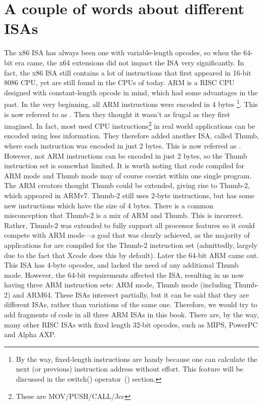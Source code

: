 \section{A couple of words about different \ac{ISA}s}
The x86 \ac{ISA} has always been one with variable-length opcodes, so when the 64-bit era came, the x64 extensions did not impact the \ac{ISA} very significantly. In fact, the x86 \ac{ISA} still contains a lot of instructions that first appeared in 16-bit 8086 CPU, yet are still found in the CPUs of today.
ARM is a \ac{RISC} \ac{CPU} designed with constant-length opcode in mind, which had some advantages in the past.
In the very beginning, all ARM instructions were encoded in 4 bytes%
\footnote{
By the way, fixed-length instructions are handy because one can calculate the next (or previous) 
instruction address without effort. This feature will be discussed in the switch() operator~() section.
}.
This is now referred to as .
Then they thought it wasn't as frugal as they first imagined.
In fact, most used \ac{CPU} instructions\footnote{These are MOV/PUSH/CALL/Jcc} in real world applications can be encoded using less information.
They therefore added another \ac{ISA}, called Thumb, where each instruction was encoded in just 2 bytes.
This is now referred as .
However, not  ARM instructions can be encoded in just 2 bytes, so the Thumb instruction set is somewhat limited.
It is worth noting that code compiled for ARM mode and Thumb mode may of course coexist within one single program.
The ARM creators thought Thumb could be extended, giving rise to Thumb-2, which appeared in ARMv7.
Thumb-2 still uses 2-byte instructions, but has some new instructions which have the size of 4 bytes.
There is a common misconception that Thumb-2 is a mix of ARM and Thumb. This is incorrect. 
Rather, Thumb-2 was extended to fully support all processor features so it could
compete with ARM mode---a goal that was clearly achieved, as the majority of applications for \idevices are compiled for the Thumb-2 instruction set (admittedly, largely due to the fact that Xcode does this by default).
Later the 64-bit ARM came out. This \ac{ISA} has 4-byte opcodes, and lacked the need of any additional Thumb mode.
However, the 64-bit requirements affected the \ac{ISA}, resulting in us now having three ARM instruction sets: ARM mode, Thumb mode (including Thumb-2) and ARM64.
These \ac{ISA}s intersect partially, but it can be said that they are different \ac{ISA}s, rather than variations of the same one.
Therefore, we would try to add fragments of code in all three ARM \ac{ISA}s in this book.
%
%
%
There are, by the way, many other \ac{RISC} \ac{ISA}s with fixed length 32-bit opcodes, such as MIPS, PowerPC and Alpha AXP.
\fi %
\fi %


